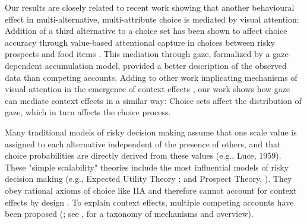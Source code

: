 \documentclass[11pt, a4paper]{article}
\begin{document}
Our results are closely related to recent work showing that another behavioural effect in multi-alternative, multi-attribute choice is mediated by visual attention: Addition of a third alternative to a choice set has been shown to affect choice accuracy through value-based attentional capture in choices between risky prospects \parencite{gluth2018ValuebasedAttentionalCapture} and food items \parencite{gluth2020ValuebasedAttentionNot}. This mediation through gaze, formalized by a gaze-dependent accumulation model, provided a better description of the observed data than competing accounts. Adding to other work implicating mechanisms of visual attention in the emergence of context effects \parencite{cataldo2019ComparisonProcessAccount,evans2021ImpactPresentationOrder}, our work shows how gaze can mediate context effects in a similar way: Choice sets affect the distribution of gaze, which in turn affects the choice process.

Many traditional models of risky decision making assume that one scale value is assigned to each alternative independent of the presence of others, and that choice probabilities are directly derived from these values (e.g., Luce, 1959). These "simple scalability" theories include the most influential models of risky decision making (e.g., Expected Utility Theory \cite{vonneumann1947TheoryGamesEconomic}; and Prospect Theory, \cite{kahneman1979ProspectTheoryAnalysis}). They obey rational axioms of choice like IIA and therefore cannot account for context effects by design \parencite{rieskamp2006ExtendingBoundsRationality}. To explain context effects, multiple competing accounts have been proposed (\cite{bhatia2013AssociationsAccumulationPreference,noguchi2018MultialternativeDecisionSampling,roe2001MultialternativeDecisionField,soltani2012RangeNormalizationModelContextDependent,trueblood2014MultiattributeLinearBallistic,usher2004LossAversionInhibition,wollschlager20122NaryChoiceTree,tsetsos2012SalienceDrivenValue}; see \cite{turner2018CompetingTheoriesMultialternative}, for a taxonomy of mechanisms and overview). 
\end{document}
